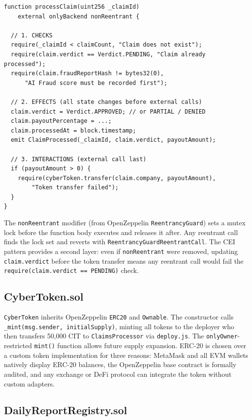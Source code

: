 \documentclass[12pt,a4paper]{article}
\begin{document}
\begin{lstlisting}[style=aegiscode, language=Solidity,
  caption={CEI pattern in ClaimsProcessor.processClaim() (condensed)}]
function processClaim(uint256 _claimId)
    external onlyBackend nonReentrant {

  // 1. CHECKS
  require(_claimId < claimCount, "Claim does not exist");
  require(claim.verdict == Verdict.PENDING, "Claim already processed");
  require(claim.fraudReportHash != bytes32(0),
      "AI Fraud score must be recorded first");

  // 2. EFFECTS (all state changes before external calls)
  claim.verdict = Verdict.APPROVED; // or PARTIAL / DENIED
  claim.payoutPercentage = ...;
  claim.processedAt = block.timestamp;
  emit ClaimProcessed(_claimId, claim.verdict, payoutAmount);

  // 3. INTERACTIONS (external call last)
  if (payoutAmount > 0) {
    require(cyberToken.transfer(claim.company, payoutAmount),
        "Token transfer failed");
  }
}
\end{lstlisting}

The \texttt{nonReentrant} modifier (from OpenZeppelin
\texttt{ReentrancyGuard}) sets a mutex lock before the function body
executes and releases it after. Any reentrant call finds the lock set
and reverts with \texttt{ReentrancyGuardReentrantCall}. The CEI pattern
provides a second layer: even if \texttt{nonReentrant} were removed,
updating \texttt{claim.verdict} before the token transfer means any
reentrant call would fail the \texttt{require(claim.verdict == PENDING)}
check.

\subsection{CyberToken.sol}
\label{sec:cyber-token}

\texttt{CyberToken} inherits OpenZeppelin \texttt{ERC20} and
\texttt{Ownable}. The constructor calls \texttt{\_mint(msg.sender,
initialSupply)}, minting all tokens to the deployer who then transfers
50,000 CIT to \texttt{ClaimsProcessor} via \texttt{deploy.js}.
The \texttt{onlyOwner}-restricted \texttt{mint()} function allows
future supply expansion. ERC-20 is chosen over a custom token
implementation for three reasons: MetaMask and all EVM wallets natively
display ERC-20 balances, the OpenZeppelin base contract is formally
audited, and any exchange or DeFi protocol can integrate the token
without custom adapters.

\subsection{DailyReportRegistry.sol}
\label{sec:daily-report}
\end{document}
